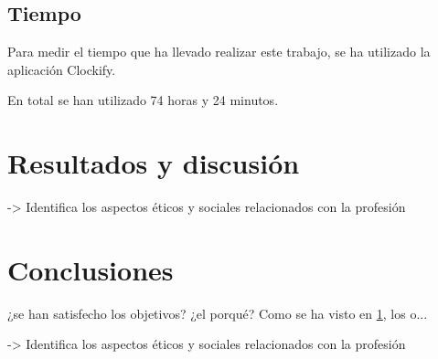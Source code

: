 \documentclass{article}
\begin{document}

        \subsection{Tiempo} %
        \label{sub:Tiempo}

            Para medir el tiempo que ha llevado realizar este trabajo, se ha utilizado la aplicación
            Clockify\cite{clockify}.\newline

            En total se han utilizado 74 horas y 24 minutos.%



\section{Resultados y discusión}
\label{sec:ResultadosyDiscusion}

    -> Identifica los aspectos éticos y sociales relacionados con la profesión


\section{Conclusiones}
\label{sec:Conclusiones}

    ¿se han satisfecho los objetivos? ¿el porqué? Como se ha visto en \ref{sec:ResultadosyDiscusion}, los o...

    -> Identifica los aspectos éticos y sociales relacionados con la profesión




\end{document}
